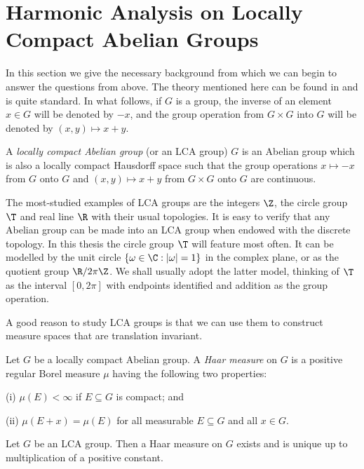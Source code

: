\section{Harmonic Analysis on Locally Compact Abelian Groups}\label{lca}

In this section we give the necessary background from which we can begin to
answer
the questions from
above. The theory mentioned here can be found in \cite{Katznelson}
and is quite
standard. In what follows, if $G$ is a group, the inverse of an
element $x\in G$ will be denoted by $-x$, and the group operation from
$G\times G$ into $G$ will be denoted by $(x,y)\mapsto x+y$.


\begin{definition} A {\em locally compact Abelian group} (or an LCA group)
$G$ is an Abelian group
which is also a locally compact Hausdorff space such that the group operations
$x\mapsto -x$ from $G$ onto $G$ and $(x,y)\mapsto x+y$ from $G\times G$
onto $G$ are continuous.
\end{definition}

The most-studied examples of LCA groups are the integers $\Z$, the circle group
$\T$ and real line $\R$ with their usual topologies.
It is easy to verify that any Abelian group can be made into an LCA group
when endowed with the discrete topology. In this thesis the circle group $\T$
will feature most often. It can be modelled by the unit circle
$\{\omega\in\C:|\omega|=1\}$
in the complex plane, or as the quotient group $\R/2\pi\Z$. We shall usually
adopt the latter model,
thinking of $\T$ as the interval $[0,2\pi]$ with endpoints identified and
addition as the group operation.

A good reason to study LCA groups is
that we can use them to construct measure spaces that are translation invariant.

\begin{definition} Let $G$ be a locally compact Abelian group. A {\em Haar
measure} on $G$ is a positive regular Borel measure $\mu$ having the
following two properties:

(i) $\mu(E)<\infty$ if $E\subseteq G$ is compact; and

(ii) $\mu(E+x)=\mu(E)$ for all measurable $E\subseteq G$ and all $x\in G$.
\end{definition}

\begin{theorem}\cite[Chapter VII, \S 2]{Katznelson}
Let $G$ be an LCA group. Then a Haar measure on $G$ exists and is unique up to
multiplication of a positive constant.
\end{theorem}

